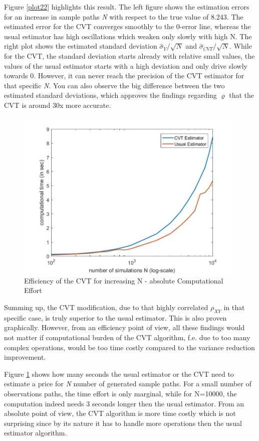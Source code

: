 \documentclass[a4paper,11pt]{article}
\begin{document}
{Figure \ref{plot22} highlights this result. The left figure shows the estimation errors for an increase in sample paths \textit{N} with respect to the true value of 8.243. The estimated error for the CVT converges smoothly to the 0-error line, whereas the usual estimator has high oscillations which weaken only slowly with high N. The right plot shows the estimated standard deviation $\hat{\sigma}_{Y}/\sqrt{N}$ and $\hat{\sigma}_{CVT}/\sqrt{N}$. While for the CVT, the standard deviation starts already with relative small values, the values of the usual estimator starts with a high deviation and only drive slowly towards 0. However, it can never reach the precision of the CVT estimator for that specific \textit{N}. You can also observe the big difference between the two estimated standard deviations, which approves the findings regarding $\varrho$ that the CVT is around 30x more accurate.

\begin{figure}[!h]
\centering
\includegraphics[width=11cm]{plot26.jpeg}
\caption{Efficiency of the CVT for increasing N - absolute Computational Effort}
\label{plot26}
\end{figure}
\newpage
Summing up, the CVT modification,  due to that highly correlated $\rho_{XY}$ in that specific case, is truly superior to the usual estimator. This is also proven graphically. However, from an efficiency point of view, all these findings would not matter if computational burden of the CVT algorithm, f.e. due to too many complex operations, would be too time costly compared to the variance reduction improvement.

Figure \ref{plot26} shows how many seconds the usual estimator or the CVT need to estimate a price for \textit{N} number of generated sample paths. For a small number of observations paths, the time effort is only marginal, while for N=10000, the computation indeed needs 3 seconds longer then the usual estimator. From an absolute point of view, the CVT algorithm is more time costly which is not surprising since by its nature it has to handle more operations then the usual estimator algorithm.

}
\end{document}
